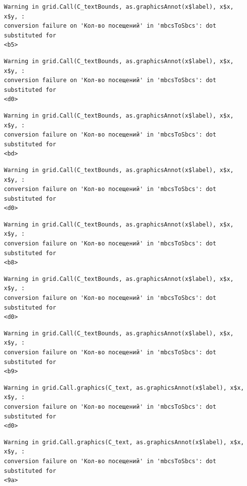 \documentclass[
  letterpaper,
  DIV=11,
  numbers=noendperiod]{scrartcl}
\begin{document}
\begin{verbatim}
Warning in grid.Call(C_textBounds, as.graphicsAnnot(x$label), x$x, x$y, :
conversion failure on 'Кол-во посещений' in 'mbcsToSbcs': dot substituted for
<b5>
\end{verbatim}

\begin{verbatim}
Warning in grid.Call(C_textBounds, as.graphicsAnnot(x$label), x$x, x$y, :
conversion failure on 'Кол-во посещений' in 'mbcsToSbcs': dot substituted for
<d0>
\end{verbatim}

\begin{verbatim}
Warning in grid.Call(C_textBounds, as.graphicsAnnot(x$label), x$x, x$y, :
conversion failure on 'Кол-во посещений' in 'mbcsToSbcs': dot substituted for
<bd>
\end{verbatim}

\begin{verbatim}
Warning in grid.Call(C_textBounds, as.graphicsAnnot(x$label), x$x, x$y, :
conversion failure on 'Кол-во посещений' in 'mbcsToSbcs': dot substituted for
<d0>
\end{verbatim}

\begin{verbatim}
Warning in grid.Call(C_textBounds, as.graphicsAnnot(x$label), x$x, x$y, :
conversion failure on 'Кол-во посещений' in 'mbcsToSbcs': dot substituted for
<b8>
\end{verbatim}

\begin{verbatim}
Warning in grid.Call(C_textBounds, as.graphicsAnnot(x$label), x$x, x$y, :
conversion failure on 'Кол-во посещений' in 'mbcsToSbcs': dot substituted for
<d0>
\end{verbatim}

\begin{verbatim}
Warning in grid.Call(C_textBounds, as.graphicsAnnot(x$label), x$x, x$y, :
conversion failure on 'Кол-во посещений' in 'mbcsToSbcs': dot substituted for
<b9>
\end{verbatim}

\begin{verbatim}
Warning in grid.Call.graphics(C_text, as.graphicsAnnot(x$label), x$x, x$y, :
conversion failure on 'Кол-во посещений' in 'mbcsToSbcs': dot substituted for
<d0>
\end{verbatim}

\begin{verbatim}
Warning in grid.Call.graphics(C_text, as.graphicsAnnot(x$label), x$x, x$y, :
conversion failure on 'Кол-во посещений' in 'mbcsToSbcs': dot substituted for
<9a>
\end{verbatim}
\end{document}
